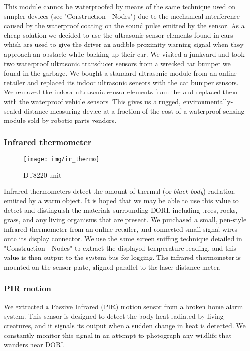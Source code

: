     This module cannot be waterproofed by means of the same technique used on simpler devices (see "Construction - Nodes") due to the mechanical interference caused by the waterproof coating on the sound pulse emitted by the sensor. As a cheap solution we decided to use the ultrasonic sensor elements found in cars which are used to give the driver an audible proximity warning signal when they approach an obstacle while backing up their car. We visited a junkyard and took two waterproof ultrasonic transducer sensors from a wrecked car bumper we found in the garbage. We bought a standard  ultrasonic module from an online retailer and replaced its indoor ultrasonic sensors with the car bumper sensors. We removed the indoor ultrasonic sensor elements from the  and replaced them with the waterproof vehicle sensors. This gives us a rugged, environmentally-sealed distance measuring device at a fraction of the cost of a waterproof sensing module sold by robotic parts vendors.

    


    \subsubsection*{Infrared thermometer}
    \begin{wrapfigure}{l}{0.25\textwidth}
        \centering
        \texttt{[image: img/ir\_thermo]}
        \caption*{DT8220 unit}
    \end{wrapfigure}
    Infrared thermometers detect the amount of thermal (or \emph{black-body}) radiation emitted by a warm object. It is hoped that we may be able to use this value to detect and distinguish the materials surrounding DORI, including trees, rocks, grass, and any living organisms that are present. We purchased a small, pen-style infrared thermometer from an online retailer, and connected small signal wires onto its display connector. We use the same screen sniffing technique detailed in "Construction - Nodes" to extract the displayed temperature reading, and this value is then output to the system bus for logging. The infrared thermometer is mounted on the sensor plate, aligned parallel to the laser distance meter.

    \subsubsection*{PIR motion}
We extracted a Passive Infrared (PIR) motion sensor from a broken home alarm system. This sensor is designed to detect the body heat radiated by living creatures, and it signals its output when a sudden change in heat is detected. We constantly monitor this signal in an attempt to photograph any wildlife that wanders near \textsc{DORI}.

